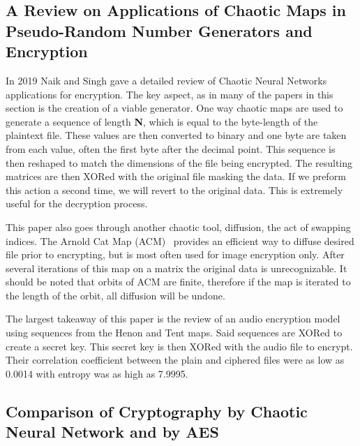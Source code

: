 \documentclass[conference]{IEEEtran}
\begin{document}
\subsection{\textbf{A Review on Applications of Chaotic Maps in Pseudo-Random Number Generators and Encryption}~\cite{Naik2022}}\label{subsec:a-review-on-applications-of-chaotic-maps-in-pseudo-random-number-generators-and-encryption}

In 2019 Naik and Singh gave a detailed review of Chaotic Neural Networks applications for encryption.
The key aspect, as in many of the papers in this section is the creation of a viable generator.
One way chaotic maps are used to generate a sequence of length \textbf{N}, which is equal to the byte-length of the plaintext file.
These values are then converted to binary and one byte are taken from each value, often the first byte after the decimal point.
This sequence is then reshaped to match the dimensions of the file being encrypted.
The resulting matrices are then XORed with the original file masking the data.
If we preform this action a second time, we will revert to the original data.
This is extremely useful for the decryption process.

This paper also goes through another chaotic tool, diffusion, the act of swapping indices.
The Arnold Cat Map (ACM)~\cite{Naik2022} provides an efficient way to diffuse desired file prior to encrypting, but is most often used for image encryption only.
After several iterations of this map on a matrix the original data is unrecognizable.
It should be noted that orbits of ACM are finite, therefore if the map is iterated to the length of the orbit, all diffusion will be undone.

The largest takeaway of this paper is the review of an audio encryption model using sequences from the Henon and Tent maps.
Said sequences are XORed to create a secret key.
This secret key is then XORed with the audio file to encrypt.
Their correlation coefficient between the plain and ciphered files were as low as 0.0014 with entropy was as high as 7.9995.

\subsection{\textbf{Comparison of Cryptography by Chaotic Neural Network and by AES}\cite{Skovajsova2019}}\label{subsec:comparison-of-cryptography-by-chaotic-neural-network-and-by-aes}
\end{document}
